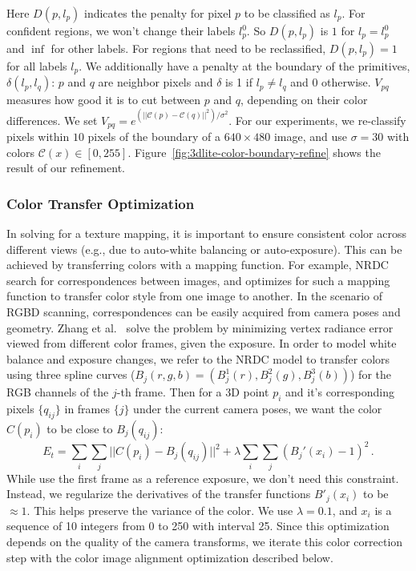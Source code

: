 Here $D(p,l_p)$ indicates the penalty for pixel $p$ to be classified as $l_p$. 
For confident regions, we won't change their labels $l_p^0$. 
So $D(p,l_p)$ is $1$ for $l_p=l_p^0$ and $\inf$ for other labels. 
For regions that need to be reclassified, $D(p,l_p)=1$ for all labels $l_p$. 
We additionally have a penalty at the boundary of the primitives, $\delta(l_p,l_q)$: $p$ and $q$ are neighbor pixels and $\delta$ is 1 if $l_p\neq l_q$ and 0 otherwise. 
$V_{pq}$ measures how good it is to cut between $p$ and $q$, depending on their color differences. We set
$V_{pq}=e^{\left(||\mathcal{C}(p)-\mathcal{C}(q)||^2\right)/\sigma^2}$.  %
For our experiments, we re-classify pixels within $10$ pixels of the boundary of a $640\times 480$ image, and use $\sigma=30$ with colors $\mathcal{C}(x)\in[0,255]$.
Figure~\ref{fig:3dlite-color-boundary-refine} shows the result of our refinement.

\subsubsection{Color Transfer Optimization}
\label{subsec:3dlite-color-transfer}
In solving for a texture mapping, it is important to ensure consistent color across different views (e.g., due to auto-white balancing or auto-exposure).
This can be achieved by transferring colors with a mapping function.
For example, NRDC~\cite{hacohen2011non} search for correspondences between images, and optimizes for such a mapping function to transfer color style from one image to another.
In the scenario of RGBD scanning, correspondences can be easily acquired from camera poses and geometry. 
Zhang et al.~\cite{zhang2016emptying} solve the problem by minimizing vertex radiance error viewed from different color frames, given the exposure. 
In order to model white balance and exposure changes, we refer to the NRDC model to transfer colors using three spline curves ($B_j(r,g,b)=(B^1_j(r),B^2_j(g),B^3_j(b))$) for the RGB channels of the $j$-th frame. 
Then for a 3D point $p_i$ and it's corresponding pixels $\{q_{ij}\}$ in frames $\{j\}$ under the current camera poses, we want the color $C(p_i)$ to be close to $B_j(q_{ij})$:
\begin{equation}
E_t = \sum_{i} \sum_{j} ||C(p_i) - B_j(q_{ij})||^2 + \lambda \sum_{i} \sum_{j} (B_j'(x_i)-1)^2\,.
\end{equation}
While \cite{zhang2016emptying} use the first frame as a reference exposure, we don't need this constraint. 
Instead, we regularize the derivatives of the transfer functions $B'_j(x_i)$ to be $\approx 1$. 
This helps preserve the variance of the color. 
We use $\lambda = 0.1$, and $x_i$ is a sequence of 10 integers from 0 to 250 with interval 25.
Since this optimization depends on the quality of the camera transforms, we iterate this color correction step with the color image alignment optimization described below.

